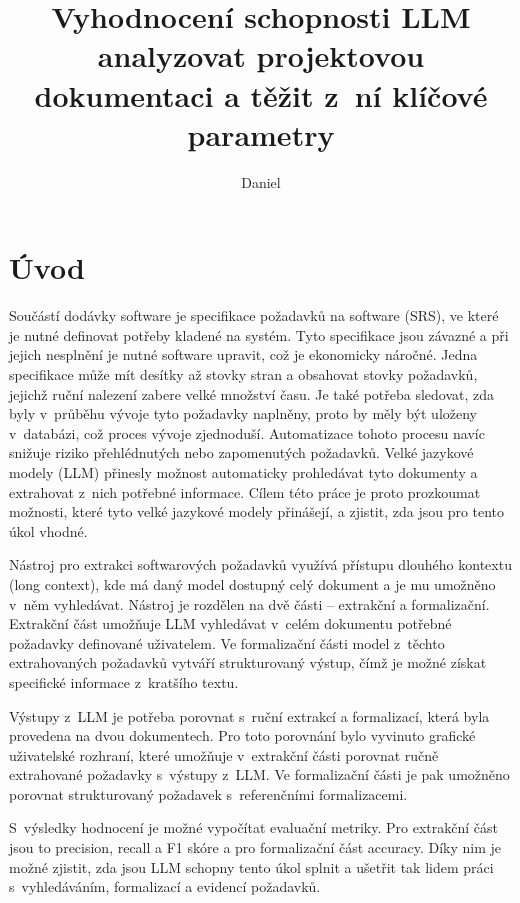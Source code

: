 \documentclass[czech, bc, kiv, he, iso690numb, pdf]{fasthesis}
\title{Vyhodnocení schopnosti LLM analyzovat projektovou dokumentaci a těžit z~ní klíčové parametry}
\author{Daniel}{Sibolerski}{}{}
\begin{document}
\frontpages[tm]
\tableofcontents


\chapter{Úvod}
Součástí dodávky software je specifikace požadavků na software (SRS), ve které je nutné definovat potřeby kladené na systém. Tyto specifikace jsou závazné a při jejich nesplnění je nutné software upravit, což je ekonomicky náročné. Jedna specifikace může mít desítky až stovky stran a obsahovat stovky požadavků, jejichž ruční nalezení zabere velké množství času. Je také potřeba sledovat, zda byly v~průběhu vývoje tyto požadavky naplněny, proto by měly být uloženy v~databázi, což proces vývoje zjednoduší. Automatizace tohoto procesu navíc snižuje riziko přehlédnutých nebo zapomenutých požadavků. Velké jazykové modely (LLM) přinesly možnost automaticky prohledávat tyto dokumenty a extrahovat z~nich potřebné informace. Cílem této práce je proto prozkoumat možnosti, které tyto velké jazykové modely přinášejí, a zjistit, zda jsou pro tento úkol vhodné.

Nástroj pro extrakci softwarových požadavků využívá přístupu dlouhého kontextu (long context), kde má daný model dostupný celý dokument a je mu umožněno v~něm vyhledávat. Nástroj je rozdělen na dvě části -- extrakční a formalizační. Extrakční část umožňuje LLM vyhledávat v~celém dokumentu potřebné požadavky definované uživatelem. Ve formalizační části model z~těchto extrahovaných požadavků vytváří strukturovaný výstup, čímž je možné získat specifické informace z~kratšího textu.

Výstupy z~LLM je potřeba porovnat s~ruční extrakcí a formalizací, která byla provedena na dvou dokumentech. Pro toto porovnání bylo vyvinuto grafické uživatelské rozhraní, které umožňuje v~extrakční části porovnat ručně extrahované požadavky s~výstupy z~LLM. Ve formalizační části je pak umožněno porovnat strukturovaný požadavek s~referenčními formalizacemi.

S~výsledky hodnocení je možné vypočítat evaluační metriky. Pro extrakční část jsou to precision, recall a F1 skóre a pro formalizační část accuracy. Díky nim je možné zjistit, zda jsou LLM schopny tento úkol splnit a ušetřit tak lidem práci s~vyhledáváním, formalizací a evidencí požadavků.
 
\end{document}
